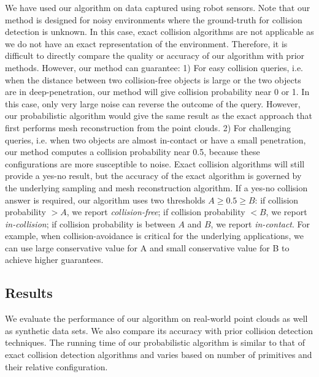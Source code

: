 We have used our algorithm on data captured using robot sensors. Note that our method is designed for noisy environments where the ground-truth for collision detection is unknown. In this case, exact collision algorithms are not applicable as we do not have an exact representation of the environment.
Therefore, it is difficult to directly compare the quality or accuracy of our algorithm with prior methods. However, our method can guarantee: 1) For easy collision queries, i.e. when the distance between two collision-free objects is large or the two objects are in deep-penetration, our method will give collision probability near 0 or 1. In this case, only very large noise can reverse the outcome of the query. However, our probabilistic algorithm would give the same result as the exact approach that first performs mesh reconstruction from the point clouds. 2) For challenging queries, i.e. when two objects are almost in-contact or have a small penetration, our method computes a collision probability near 0.5, because these configurations are more susceptible to noise. Exact collision algorithms will still provide a yes-no result, but the accuracy of the exact algorithm is governed by the underlying sampling and mesh reconstruction algorithm. If a yes-no collision answer is required, our algorithm uses two thresholds $A \geq 0.5 \geq B$: if collision probability $>A$, we report \emph{collision-free}; if collision probability $< B$, we report \emph{in-collision}; if collision probability is between $A$ and $B$, we report \emph{in-contact}. For example, when collision-avoidance is critical for the underlying applications, we can use large conservative value for A and small conservative value for B to achieve higher guarantees.

\subsection{Results}
We evaluate the performance of our algorithm on real-world point clouds as well as synthetic data sets. We also compare its accuracy with prior collision
detection techniques. The running time of our probabilistic algorithm is similar to that of exact collision detection algorithms and varies based on
number of primitives and their relative configuration.

